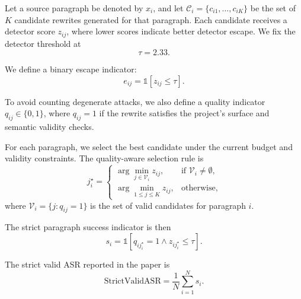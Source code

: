 Let a source paragraph be denoted by $x_i$, and let $\mathcal{C}_i = \{c_{i1}, \dots, c_{iK}\}$ be the set of $K$ candidate rewrites generated for that paragraph. Each candidate receives a detector score $z_{ij}$, where lower scores indicate better detector escape. We fix the detector threshold at
\[
\tau = 2.33.
\]

We define a binary escape indicator:
\[
e_{ij} = \mathbb{1}[z_{ij} \leq \tau].
\]

To avoid counting degenerate attacks, we also define a quality indicator $q_{ij} \in \{0,1\}$, where $q_{ij}=1$ if the rewrite satisfies the project's surface and semantic validity checks.

For each paragraph, we select the best candidate under the current budget and validity constraints. The quality-aware selection rule is
\[
j_i^\star =
\begin{cases}
\arg\min_{j \in \mathcal{V}_i} z_{ij}, & \text{if } \mathcal{V}_i \neq \emptyset, \\
\arg\min_{1 \le j \le K} z_{ij}, & \text{otherwise},
\end{cases}
\]
where $\mathcal{V}_i = \{j : q_{ij}=1\}$ is the set of valid candidates for paragraph $i$.

The strict paragraph success indicator is then
\[
s_i = \mathbb{1}[q_{i j_i^\star}=1 \wedge z_{i j_i^\star} \leq \tau].
\]

The strict valid ASR reported in the paper is
\[
\mathrm{StrictValidASR} = \frac{1}{N}\sum_{i=1}^{N} s_i.
\]

